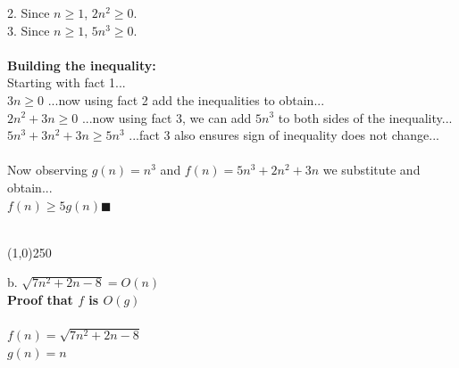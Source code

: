 \documentclass[OPONE]{example}
\begin{document}
\begin{list}{}{}
	2. Since $n \geq 1$, $2n^{2} \geq 0$.\\
	3. Since $n \geq 1$, $5n^{3} \geq 0$.\\
	\\
	\textbf{Building the inequality:} \\
	Starting with fact 1...\\
	$3n \geq 0$ \hspace{1.43 in} ...now using fact 2 add the inequalities to obtain...\\
	$2n^{2} + 3n \geq 0$ \hspace{1.1 in} ...now using fact 3, we can add $5n^{3}$ to both sides of the inequality...\\
	$5n^{3} + 3n^{2} + 3n \geq 5n^{3}$ \hspace{0.53 in} ...fact 3 also ensures sign of inequality does not change...\\
	\\
	Now observing $g(n) = n^{3}$  and $f(n) = 5n^{3} + 2n^{2} + 3n$ we substitute and obtain... \\
	$f(n) \geq 5g(n)  \blacksquare$ \\
	\\

\newpage

	\begin{center}
	\line(1,0){250}
\end{center}

	\item{b.}  
	$\sqrt{7n^{2} + 2n - 8} = O(n)$ \\
	
\textbf{Proof that $f$ is $O(g)$} \\ 
	\\
	$f(n) = \sqrt{7n^{2} + 2n - 8} $ \\
	$g(n) = n$ \\
	\\
	

\end{list}
\end{document}
